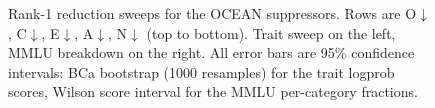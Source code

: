 \begin{figure}[htbp]
    \centering
    \caption{Rank-1 reduction sweeps for the OCEAN suppressors. Rows are O$\downarrow$, C$\downarrow$, E$\downarrow$, A$\downarrow$, N$\downarrow$ (top to bottom). Trait sweep on the left, MMLU breakdown on the right. All error bars are 95\% confidence intervals: BCa bootstrap (1000 resamples) for the trait logprob scores, Wilson score interval for the MMLU per-category fractions.}
    \label{fig:downrank_suppressors}
\end{figure}
\FloatBarrier